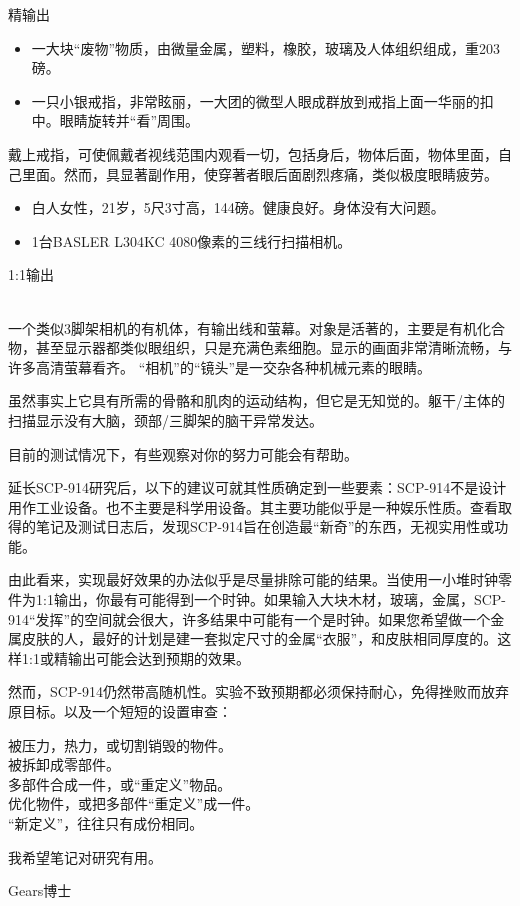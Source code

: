 精输出


\begin{itemize}
\item 一大块“废物”物质，由微量金属，塑料，橡胶，玻璃及人体组织组成，重203磅。
\item 一只小银戒指，非常眩丽，一大团的微型人眼成群放到戒指上面一华丽的扣中。眼睛旋转并“看”周围。
\end{itemize}

戴上戒指，可使佩戴者视线范围内观看一切，包括身后，物体后面，物体里面，自己里面。然而，具显著副作用，使穿著者眼后面剧烈疼痛，类似极度眼睛疲劳。




\begin{itemize}
\item 白人女性，21岁，5尺3寸高，144磅。健康良好。身体没有大问题。
\item 1台BASLER L304KC 4080像素的三线行扫描相机。
\end{itemize}

1:1输出

\\
一个类似3脚架相机的有机体，有输出线和萤幕。对象是活著的，主要是有机化合物，甚至显示器都类似眼组织，只是充满色素细胞。显示的画面非常清晰流畅，与许多高清萤幕看齐。 “相机”的“镜头”是一交杂各种机械元素的眼睛。

虽然事实上它具有所需的骨骼和肌肉的运动结构，但它是无知觉的。躯干\slash 主体的扫描显示没有大脑，颈部\slash 三脚架的脑干异常发达。


\hr


目前的测试情况下，有些观察对你的努力可能会有帮助。

延长SCP-914研究后，以下的建议可就其性质确定到一些要素：SCP-914不是设计用作工业设备。也不主要是科学用设备。其主要功能似乎是一种娱乐性质。查看取得的笔记及测试日志后，发现SCP-914旨在创造最“新奇”的东西，无视实用性或功能。

由此看来，实现最好效果的办法似乎是尽量排除可能的结果。当使用一小堆时钟零件为1:1输出，你最有可能得到一个时钟。如果输入大块木材，玻璃，金属，SCP-914“发挥”的空间就会很大，许多结果中可能有一个是时钟。如果您希望做一个金属皮肤的人，最好的计划是建一套拟定尺寸的金属“衣服”，和皮肤相同厚度的。这样1:1或精输出可能会达到预期的效果。

然而，SCP-914仍然带高随机性。实验不致预期都必须保持耐心，免得挫败而放弃原目标。以及一个短短的设置审查：

被压力，热力，或切割销毁的物件。\\
被拆卸成零部件。\\
多部件合成一件，或“重定义”物品。\\
优化物件，或把多部件“重定义”成一件。\\
“新定义”，往往只有成份相同。

我希望笔记对研究有用。

Gears博士

\hr
